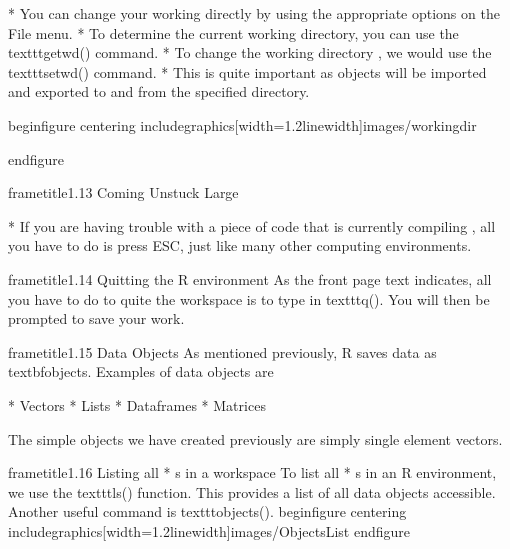  			         * You can change your working directly by using the appropriate options on the File menu. 
 			         * To
 			determine the current working directory, you can use the texttt{getwd()} command. 
 			         * To change the
 			working directory , we would use the texttt{setwd()} command.
 			          * This is quite important as objects
 			will be imported and exported to and from the specified directory.
 		
 	
 	
 		begin{figure}
 			centering
 			includegraphics[width=1.2linewidth]{images/workingdir}
 			
 		end{figure}
 		
 	
 	

 	
 		frametitle{1.13 Coming Unstuck}
 		Large
 		
 			          * If you are having trouble with a piece of code that is currently compiling , all you have to do is press ESC, just like many other computing environments.
 		  
 	
 	
 		frametitle{1.14 Quitting the R environment}
 		As the front page text indicates, all you have to do to quite the workspace is to type in texttt{q()}.
 		You will then be prompted to save your work.
 	
 	
 		frametitle{1.15 Data Objects}
 		As mentioned previously, R saves data as textbf{objects}. Examples of data objects are
 		
 			         * Vectors
 			         * Lists
 			         * Dataframes
 			         * Matrices
 		
 		The simple objects we have created previously are simply single element vectors.
 	
 	
 		frametitle{1.16 Listing all         * s in a workspace}
 		To list all         * s in an R environment, we use the texttt{ls()} function. This provides a list of all data
 		objects accessible. Another useful command is texttt{objects()}.
 		begin{figure}
 			centering
 			includegraphics[width=1.2linewidth]{images/ObjectsList}
 		end{figure}
 		
